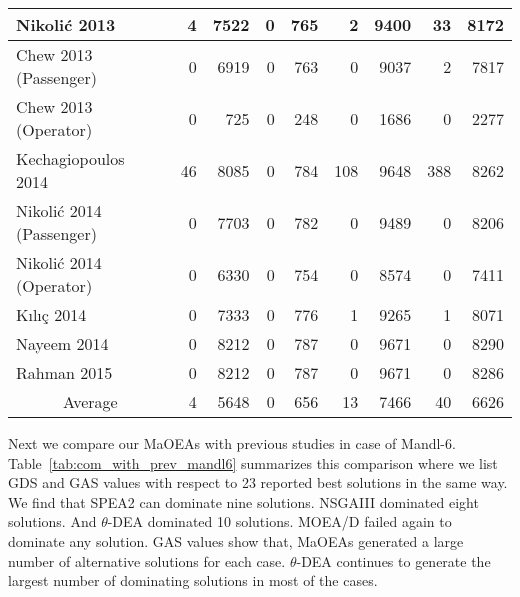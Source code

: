 \begin{table}[!htbp]
\begin{tabular}{|l|r|r||r|r||r|r||r|r|}
		\hline
		Nikoli{\'c} 2013~\cite{nikolic2013transit} & 4     & 7522  & 0     & 765   & 2     & 9400  & 33    & 8172 \\
		\hline
		Chew 2013 (Passenger)~\cite{chew2013genetic} & 0     & 6919  & 0     & 763   & 0     & 9037  & 2     & 7817 \\
		\hline
		Chew 2013 (Operator)~\cite{chew2013genetic} & 0     & 725   & 0     & 248   & 0     & 1686  & 0     & 2277 \\
		\hline
		Kechagiopoulos 2014~\cite{kechagiopoulos2014solving} & 46    & 8085  & 0     & 784   & 108   & 9648  & 388   & 8262 \\
		\hline
		Nikoli{\'c} 2014 (Passenger)~\cite{nikolic2014simultaneous} & 0     & 7703  & 0     & 782   & 0     & 9489  & 0     & 8206 \\
		\hline
		Nikoli{\'c} 2014 (Operator)~\cite{nikolic2014simultaneous} & 0     & 6330  & 0     & 754   & 0     & 8574  & 0     & 7411 \\
		\hline
		K{\i}l{\i}{\c{c}} 2014~\cite{kilicc2014demand} & 0     & 7333  & 0     & 776   & 1     & 9265  & 1     & 8071 \\
		\hline
		Nayeem 2014~\cite{nayeem2014transit} & 0     & 8212  & 0     & 787   & 0     & 9671  & 0     & 8290 \\
		\hline
		Rahman 2015~\cite{rahman2015transit} & 0     & 8212  & 0     & 787   & 0     & 9671  & 0     & 8286 \\
		\hline
		\hline
		\multicolumn{1}{|c|}{Average} & 4     & 5648  & 0     & 656   & 13    & 7466  & 40    & 6626 \\
		\hline
	\end{tabular}%
	\label{tab:com_with_prev_mandl4}%
\end{table}%

Next we compare our MaOEAs with previous studies in case of Mandl-6. Table~\ref{tab:com_with_prev_mandl6} summarizes this comparison where we list GDS and GAS values with respect to 23 reported best solutions in the same way. We find that SPEA2 can dominate nine solutions. NSGAIII dominated eight solutions. And $\theta$-DEA dominated 10 solutions. MOEA/D failed again to dominate any solution. GAS values show that, MaOEAs generated a large number of alternative solutions for each case. $\theta$-DEA continues to generate the largest number of dominating solutions in most of the cases.

